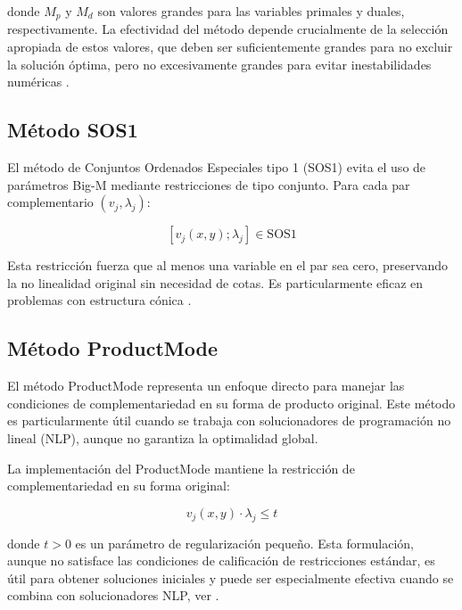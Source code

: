 donde $M_p$ y $M_d$ son valores grandes para las variables primales y duales, respectivamente. La efectividad del método depende crucialmente de la selección apropiada de estos valores, que deben ser suficientemente grandes para no excluir la solución óptima, pero no excesivamente grandes para evitar inestabilidades numéricas \cite{BilevelJump}.


\subsection{Método SOS1}

El método de Conjuntos Ordenados Especiales tipo 1 (SOS1) evita el uso de parámetros Big-M mediante restricciones de tipo conjunto. Para cada par complementario $(v_j, \lambda_j)$:

\begin{equation}
[v_j(x,y); \lambda_j] \in \text{SOS1} \label{eq:SOS1_reform}
\end{equation}

Esta restricción fuerza que al menos una variable en el par sea cero, preservando la no linealidad original sin necesidad de cotas. Es particularmente eficaz en problemas con estructura cónica \cite{BilevelJump}.


\subsection{Método ProductMode}

El método ProductMode representa un enfoque directo para manejar las condiciones de complementariedad en su forma de producto original. Este método es particularmente útil cuando se trabaja con solucionadores de programación no lineal (NLP), aunque no garantiza la optimalidad global.

La implementación del ProductMode mantiene la restricción de complementariedad en su forma original:

\begin{equation}
    v_j(x,y) \cdot \lambda_j \leq t \label{eq:ProductMode_reg}
\end{equation}

donde $t > 0$ es un parámetro de regularización pequeño. Esta formulación, aunque no satisface las condiciones de calificación de restricciones estándar, es útil para obtener soluciones iniciales y puede ser especialmente efectiva cuando se combina con solucionadores NLP, ver \cite{BilevelJump}.


